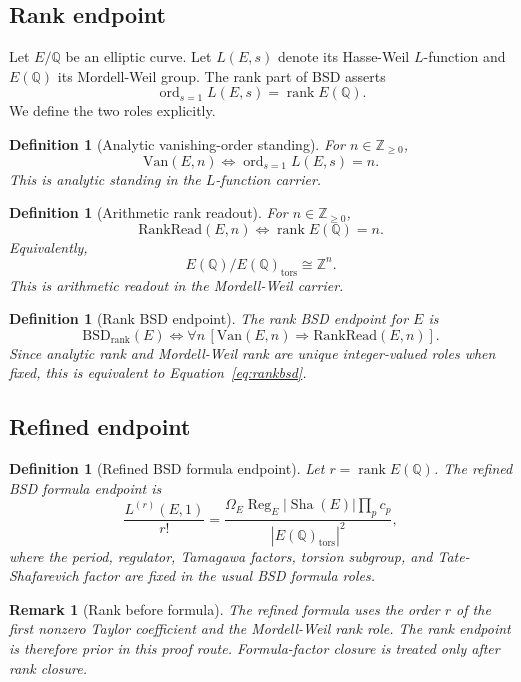 \documentclass[11pt]{article}
\newtheorem{definition}[theorem]{Definition}
\newtheorem{remark}[theorem]{Remark}
\newcommand{\Q}{\mathbb{Q}}
\newcommand{\Z}{\mathbb{Z}}
\newcommand{\Sha}{\operatorname{Sha}}
\newcommand{\rank}{\operatorname{rank}}
\newcommand{\ord}{\operatorname{ord}}
\newcommand{\Reg}{\operatorname{Reg}}
\newcommand{\tors}{\operatorname{tors}}
\newcommand{\BSD}{\mathrm{BSD}}
\newcommand{\Van}{\mathrm{Van}}
\newcommand{\RankRead}{\mathrm{RankRead}}
\begin{document}
\subsection{Rank endpoint}
Let $E/\Q$ be an elliptic curve. Let $L(E,s)$ denote its Hasse-Weil $L$-function and $E(\Q)$ its Mordell-Weil group. The rank part of BSD asserts
\begin{equation}\label{eq:rankbsd}
\ord_{s=1}L(E,s)=\rank E(\Q).
\end{equation}
We define the two roles explicitly.

\begin{definition}[Analytic vanishing-order standing]
For $n\in\Z_{\ge0}$,
\[
\Van(E,n) \Longleftrightarrow \ord_{s=1}L(E,s)=n.
\]
This is analytic standing in the $L$-function carrier.
\end{definition}

\begin{definition}[Arithmetic rank readout]
For $n\in\Z_{\ge0}$,
\[
\RankRead(E,n) \Longleftrightarrow \rank E(\Q)=n.
\]
Equivalently,
\[
E(\Q)/E(\Q)_{\tors}\cong \Z^n.
\]
This is arithmetic readout in the Mordell-Weil carrier.
\end{definition}

\begin{definition}[Rank BSD endpoint]
The rank BSD endpoint for $E$ is
\[
\BSD_{\rank}(E) \Longleftrightarrow \forall n\,[\Van(E,n)\Rightarrow \RankRead(E,n)].
\]
Since analytic rank and Mordell-Weil rank are unique integer-valued roles when fixed, this is equivalent to Equation~\eqref{eq:rankbsd}.
\end{definition}

\subsection{Refined endpoint}
\begin{definition}[Refined BSD formula endpoint]
Let $r=\rank E(\Q)$. The refined BSD formula endpoint is
\begin{equation}\label{eq:refinedbsd}
\frac{L^{(r)}(E,1)}{r!}
=
\frac{\Omega_E\Reg_E |\Sha(E)|\prod_p c_p}{|E(\Q)_{\tors}|^2},
\end{equation}
where the period, regulator, Tamagawa factors, torsion subgroup, and Tate-Shafarevich factor are fixed in the usual BSD formula roles.
\end{definition}

\begin{remark}[Rank before formula]
The refined formula uses the order $r$ of the first nonzero Taylor coefficient and the Mordell-Weil rank role. The rank endpoint is therefore prior in this proof route. Formula-factor closure is treated only after rank closure.
\end{remark}
\end{document}
